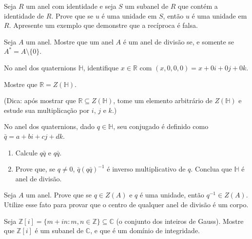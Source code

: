 \begin{exer} Seja $R$ um anel com identidade e seja $S$ um subanel de $R$ que contém a identidade de $R$.
Prove que se $u$ é uma unidade em $S$, então $u$ é uma unidade em $R$.
Apresente um exemplo que demonstre que a recíproca é falsa.

\end{exer} 
\begin{exer}
    Seja $A$ um anel. Mostre que um anel $A$ é um anel de divisão se, e somente se $A^*=A\setminus\{0\}$.
\end{exer}

\begin{exer}
    No anel dos quaternions $\mathbb H$, identifique $x \in \mathbb R$ com $(x, 0, 0, 0)=x+0i+0j+0k$.

    Mostre que $\mathbb R=Z(\mathbb H)$.

    (Dica: após mostrar que $\mathbb R\subseteq Z(\mathbb H)$, tome um elemento arbitrário de $Z(\mathbb H)$ e estude sua multiplicação por $i$, $j$ e $k$.)
\end{exer}
\begin{exer}\label{exer:quaternion}
    No anel dos quaternions, dado $q \in \mathbb H$, seu conjugado é definido como $\bar q = a + bi + cj + dk$.

    \begin{enumerate}[label=\alph*)]
        \item Calcule  $q\bar q$ e $q\bar q$.
        \item Prove que, se $q\neq 0$,  $\bar q(q\bar q)^{-1}$ é inverso multiplicativo de $q$.
        Conclua que $\mathbb H$ é anel de divisão.
    \end{enumerate}
\end{exer}
\begin{exer}
    Seja $A$ um anel. Prove que se $q \in Z(A)$ e $q$ é uma unidade, então $q^{-1} \in Z(A)$.
    Utilize esse fato para provar que o centro de qualquer anel de divisão é um corpo.
\end{exer}

\begin{exer}
    Seja $\mathbb Z[i] = \{m+in: m, n \in \mathbb Z\}\subseteq \mathbb C$ (o conjunto dos inteiros de Gauss).
    Mostre que $\mathbb Z[i]$ é um subanel de $\mathbb C$, e que é um domínio de integridade.
\end{exer}
